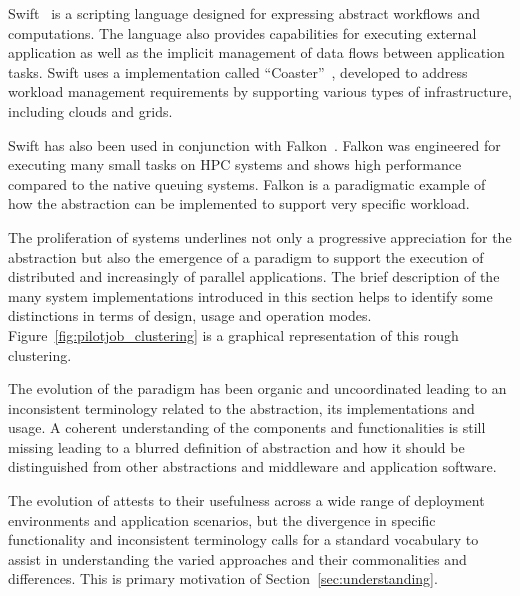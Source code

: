 \documentclass{sig-alternate}
\begin{document}
Swift~\cite{wilde2011swift} is a scripting language designed for expressing
abstract workflows and computations. The language also provides capabilities for
executing external application as well as the implicit management of data flows
between application tasks. Swift uses a \pilot implementation called
``Coaster''~\cite{coasters_url}, developed to address workload management
requirements by supporting various types of infrastructure, including clouds and
grids.

Swift has also been used in conjunction with Falkon~\cite{raicu2007}. Falkon was
engineered for executing many small tasks on HPC systems and shows high
performance compared to the native queuing systems. Falkon is a paradigmatic
example of how the \pilot abstraction can be implemented to support very
specific workload.

The proliferation of \pilotjob systems underlines not only a progressive
appreciation for the \pilot abstraction but also the emergence of a \pilot
paradigm to support the execution of distributed and increasingly of parallel
applications. The brief description of the many \pilotjob system implementations
introduced in this section helps to identify some distinctions in terms of
design, usage and operation modes. Figure~\ref{fig:pilotjob_clustering} is a
graphical representation of this rough clustering.

The evolution of the \pilot paradigm has been organic and uncoordinated leading
to an inconsistent terminology related to the \pilot abstraction, its
implementations and usage. A coherent understanding of the \pilot components and
functionalities is still missing leading to a blurred definition of \pilot
abstraction and how it should be distinguished from other abstractions and
middleware and application software.

The evolution of \pilots attests to their usefulness across a wide range of
deployment environments and application scenarios, but the divergence in
specific functionality and inconsistent terminology calls for a standard
vocabulary to assist in understanding the varied approaches and their
commonalities and differences. This is primary motivation of
Section~\ref{sec:understanding}.



\newcommand{\vocab}[1]{\textbf{#1}\xspace}
\newcommand{\prop}[1]{\textit{#1}\xspace}
\newcommand{\impterm}[1]{\texttt{#1}\xspace}
\end{document}
